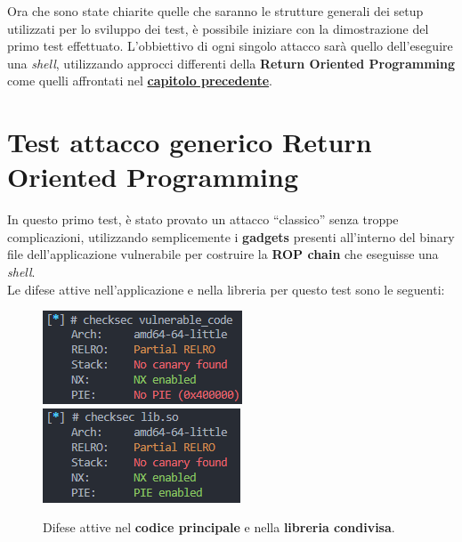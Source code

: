 Ora che sono state chiarite quelle che saranno le strutture generali dei setup utilizzati per lo sviluppo dei test, è possibile iniziare con la dimostrazione del primo test effettuato.
L'obbiettivo di ogni singolo attacco sarà quello dell'eseguire una \textit{shell}, utilizzando approcci differenti della \textbf{Return Oriented Programming} come quelli affrontati nel \hyperref[chap:Attacks]{\textbf{capitolo precedente}}.

\section{Test attacco generico Return Oriented Programming}
\label{sec:Test_1}
In questo primo test, è stato provato un attacco ``classico'' senza troppe complicazioni, utilizzando semplicemente i \textbf{gadgets} presenti all'interno del binary file dell'applicazione vulnerabile per costruire la \textbf{ROP chain} che eseguisse una \textit{shell}.\\
Le difese attive nell'applicazione e nella libreria per questo test sono le seguenti:\\
\begin{figure}[h]
      \centering
      \includegraphics[width=.3\textwidth]{images/checksec_vuln.png}\hfil
      \includegraphics[width=.3\textwidth]{images/checksec_lib.png}
      \caption{Difese attive nel \textbf{codice principale} e nella \textbf{libreria condivisa}.}\label{fig:checksec1}
\end{figure}

